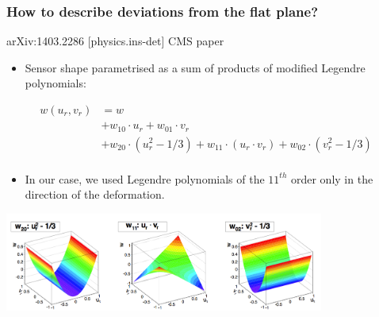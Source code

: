 \documentclass{beamer}
\begin{document}
\begin{frame}
  \frametitle{How to describe deviations from the flat plane?}

  \vspace{-0.3cm}
  \begin{block}{arXiv:1403.2286 [physics.ins-det] CMS paper}
    \begin{itemize}
      \item Sensor shape parametrised as a sum of products of modified Legendre polynomials:
    \end{itemize}
    \vspace{-0.2cm}
    \[
      \begin{array}{rl}
          w(u_r,v_r) &= w \\ 
                     &+ w_{10} \cdot u_r + w_{01} \cdot v_r \\ 
                     &+ w_{20} \cdot (u_r^2-1/3) + w_{11} \cdot (u_r \cdot v_r) + w_{02} \cdot (v_r^2 - 1/3) \\
      \end{array}
    \]
    \vspace{-0.5cm}
    \begin{itemize}
      \item In our case, we used Legendre polynomials of the $11^{th}$ order only in the direction of the deformation. 
    \end{itemize}
  \end{block}

  \vspace{-0.3cm}
  \begin{center}
    \includegraphics[width = 10.5cm]{Pictures/lagrangianPlynomials.png}
  \end{center} 

\end{frame}
\end{document}
